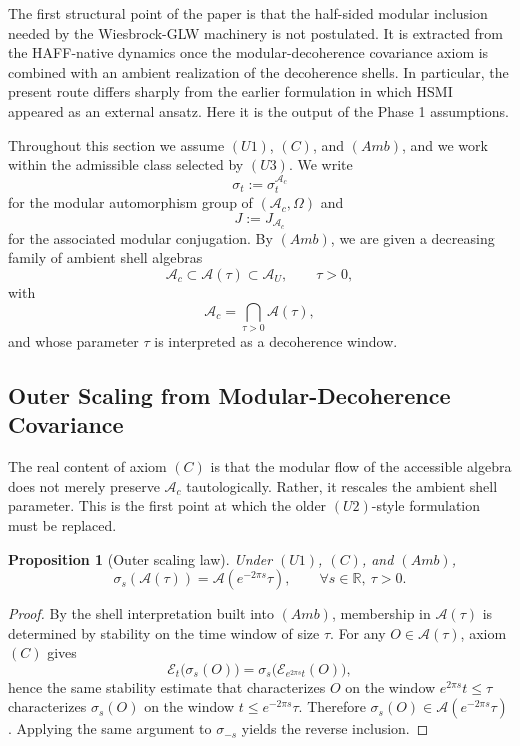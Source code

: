 \documentclass[12pt]{article}
\newtheorem{proposition}[theorem]{Proposition}
\theoremstyle{definition}
\theoremstyle{remark}
\begin{document}
The first structural point of the paper is that the half-sided modular
inclusion needed by the Wiesbrock-GLW machinery is not postulated. It is
extracted from the HAFF-native dynamics once the modular-decoherence
covariance axiom is combined with an ambient realization of the
decoherence shells. In particular, the present route differs sharply
from the earlier formulation in which HSMI appeared as an external
ansatz. Here it is the output of the Phase 1 assumptions.

Throughout this section we assume \((U1)\), \((C)\), and \((Amb)\), and
we work within the admissible class selected by \((U3)\). We write \[
\sigma_t := \sigma_t^{\mathcal{A}_c}
\] for the modular automorphism group of \((\mathcal{A}_c,\Omega)\) and
\[
J := J_{\mathcal{A}_c}
\] for the associated modular conjugation. By \((Amb)\), we are given a
decreasing family of ambient shell algebras \[
\mathcal{A}_c \subset \mathcal{A}(\tau) \subset \mathcal{A}_U,
\qquad
\tau>0,
\] with \[
\mathcal{A}_c=\bigcap_{\tau>0}\mathcal{A}(\tau),
\] and whose parameter \(\tau\) is interpreted as a decoherence window.

\subsection{Outer Scaling from Modular-Decoherence
Covariance}\label{outer-scaling-from-modular-decoherence-covariance}

The real content of axiom \((C)\) is that the modular flow of the
accessible algebra does not merely preserve \(\mathcal{A}_c\)
tautologically. Rather, it rescales the ambient shell parameter. This is
the first point at which the older \((U2)\)-style formulation must be
replaced.

\begin{proposition}[Outer scaling law]\label{prop:4.1}
Under \((U1)\), \((C)\), and \((Amb)\), \[
\sigma_s(\mathcal{A}(\tau))=\mathcal{A}(e^{-2\pi s}\tau),
\qquad
\forall s\in\mathbb{R},\ \tau>0.
\]
\end{proposition}

\begin{proof}
By the shell interpretation built into \((Amb)\), membership in
\(\mathcal{A}(\tau)\) is determined by stability on the time window of
size \(\tau\). For any \(O\in\mathcal{A}(\tau)\), axiom \((C)\) gives \[
\mathcal{E}_t\!\big(\sigma_s(O)\big)
=
\sigma_s\!\big(\mathcal{E}_{e^{2\pi s}t}(O)\big),
\] hence the same stability estimate that characterizes \(O\) on the
window \(e^{2\pi s}t\le \tau\) characterizes \(\sigma_s(O)\) on the
window \(t\le e^{-2\pi s}\tau\). Therefore
\(\sigma_s(O)\in\mathcal{A}(e^{-2\pi s}\tau)\). Applying the same
argument to \(\sigma_{-s}\) yields the reverse inclusion.
\end{proof}
\end{document}
